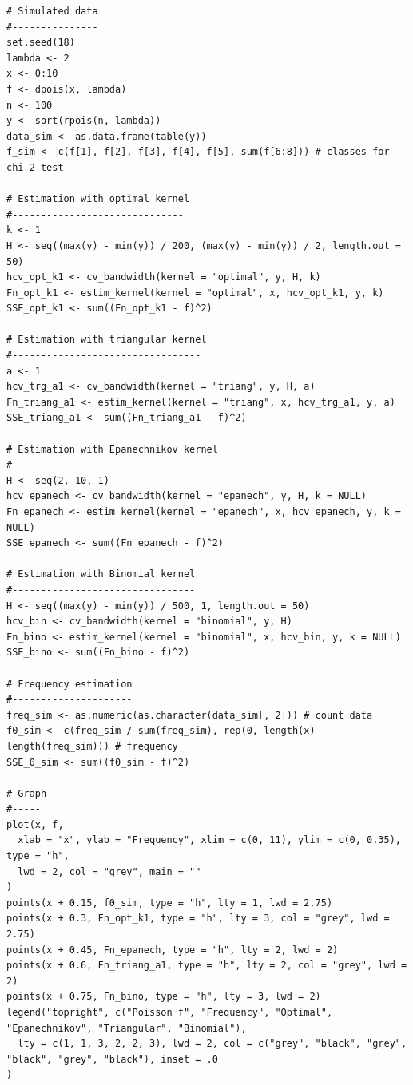 \begin{verbatim}
# Simulated data
#---------------
set.seed(18)
lambda <- 2
x <- 0:10
f <- dpois(x, lambda)
n <- 100
y <- sort(rpois(n, lambda))
data_sim <- as.data.frame(table(y))
f_sim <- c(f[1], f[2], f[3], f[4], f[5], sum(f[6:8])) # classes for chi-2 test

# Estimation with optimal kernel
#------------------------------
k <- 1
H <- seq((max(y) - min(y)) / 200, (max(y) - min(y)) / 2, length.out = 50)
hcv_opt_k1 <- cv_bandwidth(kernel = "optimal", y, H, k)
Fn_opt_k1 <- estim_kernel(kernel = "optimal", x, hcv_opt_k1, y, k)
SSE_opt_k1 <- sum((Fn_opt_k1 - f)^2)

# Estimation with triangular kernel
#---------------------------------
a <- 1
hcv_trg_a1 <- cv_bandwidth(kernel = "triang", y, H, a)
Fn_triang_a1 <- estim_kernel(kernel = "triang", x, hcv_trg_a1, y, a)
SSE_triang_a1 <- sum((Fn_triang_a1 - f)^2)

# Estimation with Epanechnikov kernel
#-----------------------------------
H <- seq(2, 10, 1)
hcv_epanech <- cv_bandwidth(kernel = "epanech", y, H, k = NULL)
Fn_epanech <- estim_kernel(kernel = "epanech", x, hcv_epanech, y, k = NULL)
SSE_epanech <- sum((Fn_epanech - f)^2)

# Estimation with Binomial kernel
#--------------------------------
H <- seq((max(y) - min(y)) / 500, 1, length.out = 50)
hcv_bin <- cv_bandwidth(kernel = "binomial", y, H)
Fn_bino <- estim_kernel(kernel = "binomial", x, hcv_bin, y, k = NULL)
SSE_bino <- sum((Fn_bino - f)^2)

# Frequency estimation
#---------------------
freq_sim <- as.numeric(as.character(data_sim[, 2])) # count data
f0_sim <- c(freq_sim / sum(freq_sim), rep(0, length(x) - length(freq_sim))) # frequency
SSE_0_sim <- sum((f0_sim - f)^2)

# Graph
#-----
plot(x, f,
  xlab = "x", ylab = "Frequency", xlim = c(0, 11), ylim = c(0, 0.35), type = "h",
  lwd = 2, col = "grey", main = ""
)
points(x + 0.15, f0_sim, type = "h", lty = 1, lwd = 2.75)
points(x + 0.3, Fn_opt_k1, type = "h", lty = 3, col = "grey", lwd = 2.75)
points(x + 0.45, Fn_epanech, type = "h", lty = 2, lwd = 2)
points(x + 0.6, Fn_triang_a1, type = "h", lty = 2, col = "grey", lwd = 2)
points(x + 0.75, Fn_bino, type = "h", lty = 3, lwd = 2)
legend("topright", c("Poisson f", "Frequency", "Optimal", "Epanechnikov", "Triangular", "Binomial"),
  lty = c(1, 1, 3, 2, 2, 3), lwd = 2, col = c("grey", "black", "grey", "black", "grey", "black"), inset = .0
)
\end{verbatim}

